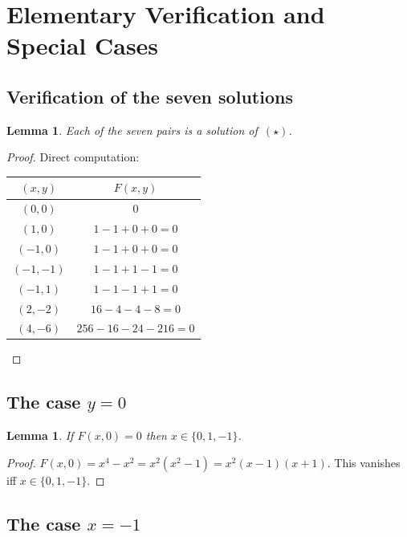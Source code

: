 \documentclass[12pt, a4paper]{article}
\newtheorem{lemma}[theorem]{Lemma}
\theoremstyle{definition}
\begin{document}
\section{Elementary Verification and Special Cases}
\label{sec:elementary}

\subsection{Verification of the seven solutions}

\begin{lemma}\label{lem:check}
  Each of the seven pairs is a solution of~$(\star)$.
\end{lemma}
\begin{proof}
  Direct computation:
  \begin{center}
  \renewcommand{\arraystretch}{1.2}
  \begin{tabular}{c c}
  \toprule
  $(x,y)$ & $F(x,y)$ \\
  \midrule
  $(0,0)$ & $0$ \\
  $(1,0)$ & $1-1+0+0=0$ \\
  $(-1,0)$ & $1-1+0+0=0$ \\
  $(-1,-1)$ & $1-1+1-1=0$ \\
  $(-1,1)$ & $1-1-1+1=0$ \\
  $(2,-2)$ & $16-4-4-8=0$ \\
  $(4,-6)$ & $256-16-24-216=0$ \\
  \bottomrule
  \end{tabular}
  \end{center}
\end{proof}

\subsection{The case $y = 0$}

\begin{lemma}\label{lem:y0}
  If $F(x,0) = 0$ then $x \in \{0,1,-1\}$.
\end{lemma}
\begin{proof}
  $F(x,0) = x^4 - x^2 = x^2(x^2-1) = x^2(x-1)(x+1)$.  This vanishes iff $x \in \{0,1,-1\}$.
\end{proof}

\subsection{The case $x = -1$}
\end{document}
